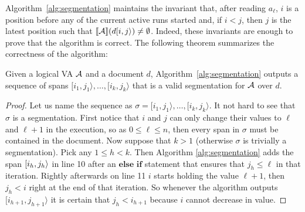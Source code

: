 Algorithm~\ref{alg:segmentation} maintains the invariant that, after reading
$a_\ell$, $i$ is a position before any of the current active runs started and,
if $i < j$,  then $j$ is the latest position such that $\llbracket\mathcal{A}\rrbracket(d[i, j\rangle)
\neq \emptyset$. Indeed, these invariants are enough to prove that the algorithm
is correct. The following theorem summarizes the correctness of the algorithm:

\begin{theorem}\label{theo:segmentation} Given a logical VA $\mathcal{A}$ and a document
	$d$, Algorithm~\ref{alg:segmentation} outputs a sequence of spans $[i_1,
	j_1\rangle, \ldots, [i_k, j_k\rangle$ that is a valid segmentation for $\mathcal{A}$
	over $d$.
\end{theorem}
\begin{proof}
	Let us name the sequence as $\sigma = [i_1, j_1\rangle, \ldots, [i_k,
	j_k\rangle$. It not hard to see that $\sigma$ is a segmentation. First
	notice that $i$ and $j$ can only change their values to $\ell$ and $\ell +
	1$ in the execution, so as $ 0 \leq \ell \leq n$, then every span in
	$\sigma$ must be contained in the document. Now suppose that $k > 1$
	(otherwise $\sigma$ is trivially a segmentation). Pick any $1 \leq h < k$.
	Then Algorithm \ref*{alg:segmentation} adds the span $[i_h, j_h\rangle$ in
	line 10 after an $\textbf{else if}$ statement that ensures that $j_h \leq
	\ell$ in that iteration. Rightly afterwards on line 11 $i$ starts holding
	the value $\ell + 1$, then $j_h < i$ right at the end of that iteration. So
	whenever the algorithm outputs $[i_{h+1}, j_{h+1}\rangle$ it is certain that
	$j_h < i_{h+1}$ because $i$ cannot decrease in value. 


\end{proof}
